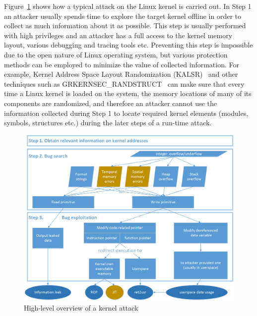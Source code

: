 Figure~\ref{fig:exploit-steps} shows how a typical attack on the Linux kernel is carried out. In Step 1 an attacker usually spends time to explore the target kernel offline in order to collect as much information about it as possible. This step is usually performed with high privileges and an attacker has a full access to the kernel memory layout, various debugging and tracing tools etc. Preventing this step is impossible due to the open nature of Linux operating system, but various protection methods can be employed to minimize the value of collected information. For example, Kernel Address Space Layout Randomization (KALSR)~\cite{cook2013} and other techniques such as GRKERNSEC\_RANDSTRUCT~\cite{randstruct2017} can make sure that every time a Linux kernel is loaded on the system, the memory locations of many of its components are randomized, and therefore an attacker cannot use the information collected during Step 1 to locate required kernel elements (modules, symbols, structures etc.) during the later steps of a run-time attack. 

\begin{figure}[t]
	\centering
		\includegraphics[width=1\textwidth]{figures/kernel_exploit_steps.png}
	\caption{High-level overview of a kernel attack}
	\label{fig:exploit-steps}
\end{figure}    


